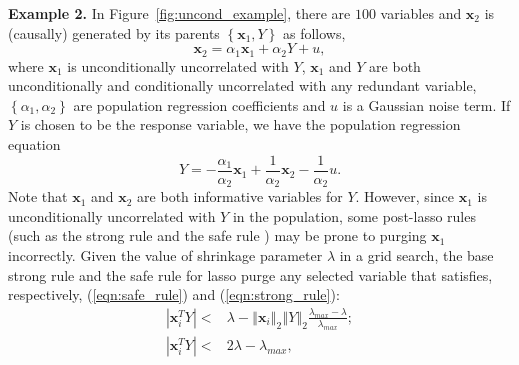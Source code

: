 \documentclass[12pt]{article}
\begin{document}
\smallskip
\noindent
\textbf{Example 2.} In Figure~\ref{fig:uncond_example}, there are $100$ variables and $\mathbf{x}_2$ is (causally) generated by its parents $\left\{ \mathbf{x}_1, Y \right\}$ as follows,
%
\begin{equation}
  \mathbf{x}_2 = \alpha_1 \mathbf{x}_1 + \alpha_2 Y + u,
  \label{eqn:collider_1}
\end{equation}
%
where $\mathbf{x}_1$ is unconditionally uncorrelated with $Y$, $\mathbf{x}_1$ and $Y$ are both unconditionally and conditionally uncorrelated with any redundant variable, $\left\{\alpha_1, \alpha_2 \right\}$ are population regression coefficients and $u$ is a Gaussian noise term. If $Y$ is chosen to be the response variable, we have the population regression equation
%
\begin{equation}
  Y = -\frac{\alpha_1}{\alpha_2} \mathbf{x}_1 + \frac{1}{\alpha_2} \mathbf{x}_2 - \frac{1}{\alpha_2}u.
  \label{eqn:collider_2}
\end{equation}
%
Note that $\mathbf{x}_1$ and $\mathbf{x}_2$ are both informative variables for $Y$. However, since $\mathbf{x}_1$ is unconditionally uncorrelated with $Y$ in the population, some post-lasso rules (such as the strong rule \citep{tibshirani2012strong} and the safe rule \citep{ghaoui2010safe}) may be prone to purging $\mathbf{x}_1$ incorrectly. Given the value of shrinkage parameter $\lambda$ in a grid search, the base strong rule and the safe rule for lasso purge any selected variable that satisfies, respectively, (\ref{eqn:safe_rule}) and (\ref{eqn:strong_rule}):
%
\begin{eqnarray}
  \left\vert \mathbf{x}_i^T Y \right\vert < & \lambda - \left\Vert \mathbf{x}_i \right\Vert_2 \left\Vert Y \right\Vert_2 \frac{\lambda_{max} - \lambda} {\lambda_{max}} ; \label{eqn:safe_rule} \\
  \left\vert \mathbf{x}_i^T Y \right\vert < & 2\lambda - \lambda_{max} , \label{eqn:strong_rule}
  \label{eqn:post_estmation_rule}
\end{eqnarray}
%
\end{document}
